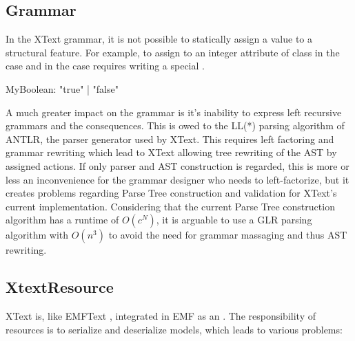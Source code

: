 \subsection{Grammar}
In the XText grammar, it is not possible to statically assign a value to a structural feature. For example, to assign  to an integer attribute  of class  in the  case and  in the  case requires writing a special . 
\begin{xtxt}
MyBoolean:  "true" | "false"
\end{xtxt}

A much greater impact on the grammar is it's inability to express left recursive grammars and the consequences. This is owed to the LL(*) parsing algorithm of ANTLR, the parser generator used by XText. This requires left factoring and grammar rewriting which lead to XText allowing tree rewriting of the AST by assigned actions. If only parser and AST construction is regarded, this is more or less an inconvenience for the grammar designer who needs to left-factorize, but it creates problems regarding Parse Tree construction and validation for XText's current implementation. Considering that the current Parse Tree construction algorithm has a runtime of $O(c^N)$, it is arguable to use a GLR parsing algorithm with $O(n^3)$ to avoid the need for grammar massaging and thus AST rewriting.

\subsection{XtextResource}
XText is, like EMFText \cite{EMFTextMan}, integrated in EMF as an . The responsibility of resources is to serialize and deserialize models, which leads to various problems: 

